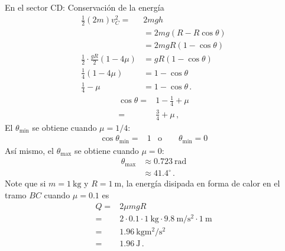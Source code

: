 \begin{itemize}
En el sector CD: Conservación de la energía
\begin{align}
  \tfrac{1}{2}(2m)v_C^2=&2mgh\nonumber\\
&=2mg(R-R\cos\theta)\nonumber\\
&=2mgR(1-\cos\theta)\nonumber\\
  \frac{1}{2}\cdot\frac{gR}{2}\left(1-4\mu \right)&=gR(1-\cos\theta)\nonumber\\
  \frac{1}{4}\left(1-4\mu \right)&=1-\cos\theta\nonumber\\
  \frac{1}{4}-\mu&=1-\cos\theta\,.
\end{align}
\begin{align}
  \cos\theta=&1-\frac{1}{4}+\mu\nonumber\\
  =&\frac{3}{4}+\mu\,,
\end{align}
El $\theta_{\text{min}}$ se obtiene cuando $\mu=1/4$:
\begin{align}
 \cos \theta_{\text{min}}=&1 &\text{o} \qquad \theta_{\text{min}}=0
\end{align}
Así mismo, el $\theta_{\text{max}}$ se obtiene cuando $\mu=0$:
\begin{align}
  \theta_{\text{max}}&\approx 0.723\ \text{rad}\nonumber\\
&\approx 41.4^\circ\,.
\end{align}
Note que si $m=\SI{1}{\kilo\gram}$ y $R=\SI{1}{\meter}$, la energía disipada en
forma de calor en el tramo $BC$ cuando $\mu=0.1$ es
\begin{align}
  Q=&2 \mu m g R\nonumber\\
  =&2\cdot 0.1\cdot \SI{1}{\kilo\gram}\cdot \SI{9.8}{\meter\per\second^2}\cdot
  \SI{1}{\meter}\nonumber\\
  =&\SI{1.96}{\kilo\gram \meter^2\per\second^2}\nonumber\\
  =&\SI{1.96}{\joule}\,.
\end{align}

\end{itemize}

